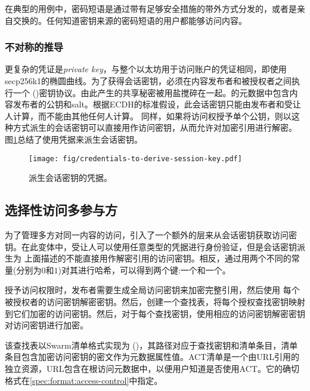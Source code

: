 在典型的用例中，密码短语是通过带有足够安全措施的带外方式分发的，或者是亲自交换的。任何知道密钥来源的密码短语的用户都能够访问内容。

\subsubsection{不对称的推导}

更复杂的凭证是\emph{private key}，与整个以太坊用于访问账户的凭证相同，即使用secp256k1的椭圆曲线。为了获得会话密钥，必须在内容发布者和被授权者之间执行一个 ()密钥协议。由此产生的共享秘密被用盐搅碎在一起。的元数据中包含内容发布者的公钥和salt。根据ECDH的标准假设，此会话密钥只能由发布者和受让人计算，而不能由其他任何人计算。 
同样，如果将访问权授予单个公钥，则以这种方式派生的会话密钥可以直接用作访问密钥，从而允许对加密引用进行解密。
图\ref{fig:credentials-to-derive-session-key}总结了使用凭据来派生会话密钥。

\begin{figure}[htbp]
\centering
\texttt{[image: fig/credentials-to-derive-session-key.pdf]}
\caption[派生会话密钥的凭据\statusyellow]{派生会话密钥的凭据。}
\label{fig:credentials-to-derive-session-key}
\end{figure}


\subsection{选择性访问多参与方\statusgreen}

为了管理多方对同一内容的访问，引入了一个额外的层来从会话密钥获取访问密钥。在此变体中，受让人可以使用任意类型的凭据进行身份验证，但是会话密钥派生为
上面描述的不能直接用作解密引用的访问密钥。相反，通过用两个不同的常量(分别为$0$和$1$)对其进行哈希，可以得到两个键:一个和一个。

授予访问权限时，发布者需要生成全局访问密钥来加密完整引用，然后使用
每个被授权者的访问密钥解密密钥。然后，创建一个查找表，将每个授权查找密钥映射到它们加密的访问密钥。然后，对于每个查找密钥，使用相应的访问密钥解密密钥对访问密钥进行加密。

该查找表以Swarm清单格式实现为 ()，其路径对应于查找密钥和清单条目，清单条目包含加密访问密钥的密文作为元数据属性值。ACT清单是一个由URL引用的独立资源，URL包含在根访问元数据中，以便用户知道是否使用ACT。它的确切格式在\ref{spec:format:access-control}中指定。

